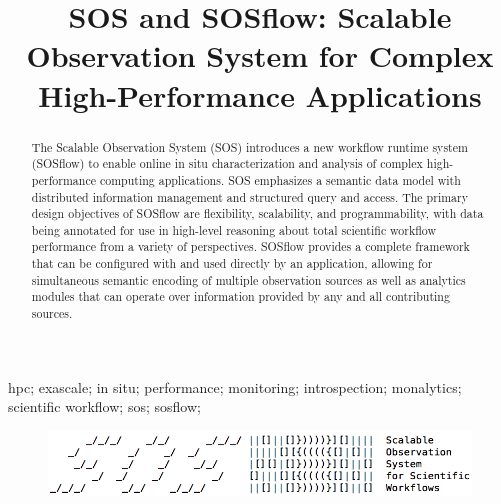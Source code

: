 
\title{SOS and SOSflow: Scalable Observation System for Complex High-Performance Applications}

\author{
         }

\maketitle


\begin{abstract}
The Scalable Observation System (SOS) introduces a new workflow
runtime system (SOSflow) to enable online in situ characterization and
analysis of complex high-performance computing applications.
%
SOS emphasizes a semantic data model with distributed information
management and structured query and access.
%
The primary design objectives of SOSflow are flexibility, scalability,
and programmability, with data being annotated for use in high-level
reasoning about total scientific workflow performance from a variety
of perspectives.
%
SOSflow provides a complete framework that can be configured with and
used directly by an application, allowing for simultaneous semantic
encoding of multiple observation sources as well as analytics modules
that can operate over information provided by any and all contributing
sources.
\end{abstract}


\begin{IEEEkeywords}
hpc; exascale; in situ; performance; monitoring; introspection;
monalytics; scientific workflow; sos; sosflow;
\end{IEEEkeywords}


\IEEEpeerreviewmaketitle


\begin{figure}[!t]
\centering
\includegraphics[width=5in]{images/sosflow_masthead.png}
\label{fig_sim}
\end{figure}



